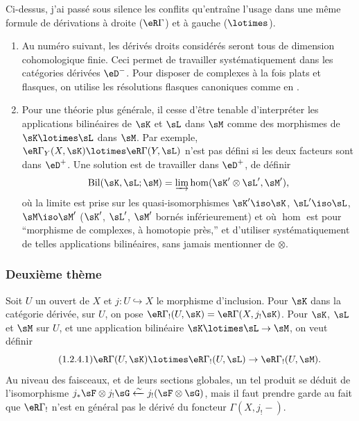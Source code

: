 \subsubsection{}\label{IV:1-2-3}

Ci-dessus, j'ai passé sous silence les conflits qu'entraîne l'usage dans une 
même formule de dérivations à droite ($\eR\Gamma$) et à gauche 
($\lotimes$). 
\begin{enumerate}[\indent a)]
  \item Au numéro suivant, les dérivés droits considérés seront tous 
    de dimension cohomologique finie. Ceci permet de travailler 
    systématiquement dans les catégories dérivées $\eD^-$. Pour disposer 
    de complexes à la fois plats et flasques, on utilise les résolutions 
    flasques canoniques comme en \cite[XVII]{sga4}. 
  \item Pour une théorie plus générale, il cesse d'être tenable d'interpréter 
    les applications bilinéaires de $\sK$ et $\sL$ dans $\sM$ comme des 
    morphismes de $\sK\lotimes\sL$ dans $\sM$. Par exemple, 
    $\eR\Gamma_Y(X,\sK)\lotimes\eR\Gamma(Y,\sL)$ n'est pas défini si les deux 
    facteurs sont dans $\eD^+$. Une solution est de travailler dans $\eD^+$, de 
    définir 
    \[
      \operatorname{Bil}(\sK,\sL;\sM) = \varinjlim \hom(\sK'\otimes\sL',\sM') \text{,}
    \]
    où la limite est prise sur les quasi-isomorphismes $\sK'\iso \sK$, 
    $\sL'\iso \sL$, $\sM\iso \sM'$ ($\sK'$, $\sL'$, $\sM'$ bornés 
    inférieurement) et où $\hom$ est pour ``morphisme de complexes, à 
    homotopie près,'' et d'utiliser systématiquement de telles applications 
    bilinéaires, sans jamais mentionner de $\otimes$.  
\end{enumerate}




\subsubsection{Deuxième thème}\label{IV:1-2-4}

Soit $U$ un ouvert de $X$ et $j:U\hookrightarrow X$ le morphisme d'inclusion. 
Pour $\sK$ dans la catégorie dérivée, sur $U$, on pose 
$\eR\Gamma_!(U,\sK)=\eR\Gamma(X,j_!\sK)$. Pour $\sK$, $\sL$ et $\sM$ sur $U$, et 
une application bilinéaire $\sK\lotimes\sL\to\sM$, on veut définir 
\begin{equation*}\tag{1.2.4.1}\label{IV:eq:1-2-4-1}
  \eR\Gamma(U,\sK)\lotimes\eR\Gamma_!(U,\sL)\to\eR\Gamma_!(U,\sM) \text{.}
\end{equation*}
Au niveau des faisceaux, et de leurs sections globales, un tel produit se 
déduit de l'isomorphisme 
$j_*\sF\otimes j_!\sG\xleftarrow\sim j_!(\sF\otimes \sG)$, mais il faut prendre 
garde au fait que $\eR\Gamma_!$ n'est en général pas le dérivé du 
foncteur $\Gamma(X,j_!-)$. 

